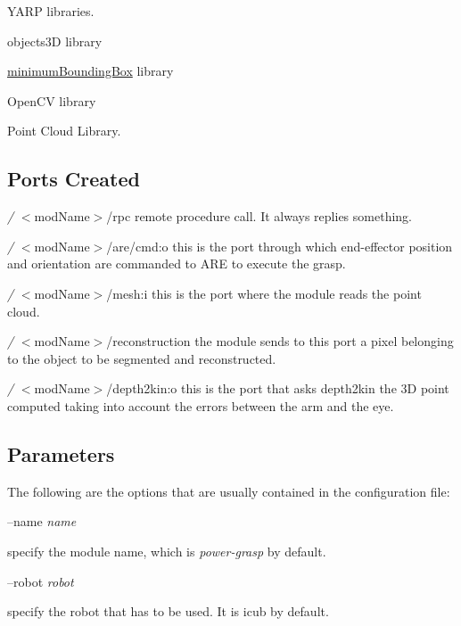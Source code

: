 \begin{DoxyItemize}
\item Y\+A\+RP libraries.
\item objects3D library
\item \hyperlink{group__minimumBoundingBox}{minimum\+Bounding\+Box} library
\item Open\+CV library
\item Point Cloud Library.
\end{DoxyItemize}\hypertarget{group__handIKModule_portsc_sec}{}\subsection{Ports Created}\label{group__handIKModule_portsc_sec}

\begin{DoxyItemize}
\item {\itshape /} $<$mod\+Name$>$/rpc remote procedure call. It always replies something.
\item {\itshape /} $<$mod\+Name$>$/are/cmd\+:o this is the port through which end-\/effector position and orientation are commanded to A\+RE to execute the grasp.
\item {\itshape /} $<$mod\+Name$>$/mesh\+:i this is the port where the module reads the point cloud.
\item {\itshape /} $<$mod\+Name$>$/reconstruction the module sends to this port a pixel belonging to the object to be segmented and reconstructed.
\item {\itshape /} $<$mod\+Name$>$/depth2kin\+:o this is the port that asks depth2kin the 3D point computed taking into account the errors between the arm and the eye.
\end{DoxyItemize}\hypertarget{group__handIKModule_parameters_sec}{}\subsection{Parameters}\label{group__handIKModule_parameters_sec}
The following are the options that are usually contained in the configuration file\+:

--name {\itshape name} 
\begin{DoxyItemize}
\item specify the module name, which is {\itshape power-\/grasp} by default.
\end{DoxyItemize}

--robot {\itshape robot} 
\begin{DoxyItemize}
\item specify the robot that has to be used. It is icub by default.
\end{DoxyItemize}

